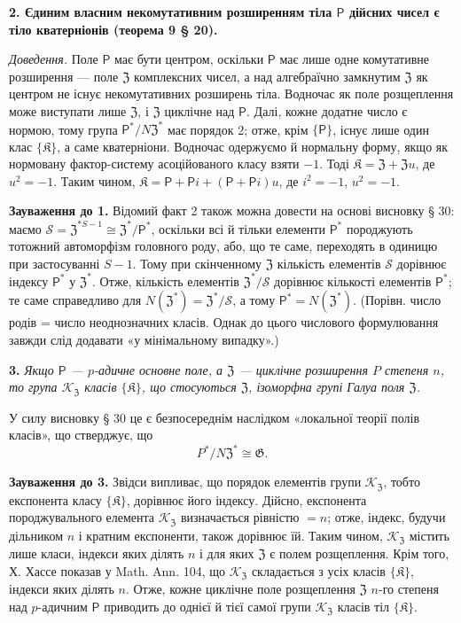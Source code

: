 \documentclass[11pt]{article}
\begin{document}
\noindent\textbf{2. Єдиним власним некомутативним розширенням тіла \(\mathsf{P}\) дійсних чисел є тіло кватерніонів (теорема 9 § 20).}

\noindent\emph{Доведення.} Поле \(\mathsf{P}\) має бути центром, оскільки \(\mathsf{P}\) має лише одне комутативне розширення --- поле \(\mathfrak Z\) комплексних чисел, а над алгебраїчно замкнутим \(\mathfrak Z\) як центром не існує некомутативних розширень тіла. Водночас як поле розщеплення може виступати лише \(\mathfrak Z\), і \(\mathfrak Z\) циклічне над \(\mathsf{P}\). Далі, кожне додатне число є нормою, тому група \(\mathsf{P}^*/N\mathfrak Z^*\) має порядок 2; отже, крім \(\{\mathsf{P}\}\), існує лише один клас \(\{\mathfrak K\}\), а саме кватерніони. Водночас одержуємо й нормальну форму, якщо як нормовану фактор-систему асоційованого класу взяти \(-1\). Тоді \(\mathfrak K=\mathfrak Z+\mathfrak Zu\), де \(u^2=-1\). Таким чином, \(\mathfrak K=\mathsf P+\mathsf Pi+(\mathsf P+\mathsf Pi)u\), де \(i^2=-1\), \(u^2=-1\).

\noindent\textbf{Зауваження до 1.} Відомий факт 2 також можна довести на основі висновку § 30: маємо \(\mathscr S=\mathfrak Z^{*S-1}\cong\mathfrak Z^*/\mathsf{P}^*\), оскільки всі й тільки елементи \(\mathsf{P}^*\) породжують тотожний автоморфізм головного роду, або, що те саме, переходять в одиницю при застосуванні \(S-1\). Тому при скінченному \(\mathfrak Z\) кількість елементів \(\mathscr S\) дорівнює індексу \(\mathsf{P}^*\) у \(\mathfrak Z^*\). Отже, кількість елементів \(\mathfrak Z^*/\mathscr S\) дорівнює кількості елементів \(\mathsf{P}^*\); те саме справедливо для \(N(\mathfrak Z^*)=\mathfrak Z^*/\mathscr S\), а тому \(\mathsf{P}^*=N(\mathfrak Z^*)\). (Порівн. число родів = число неоднозначних класів. Однак до цього числового формулювання завжди слід додавати «у мінімальному випадку».)

\noindent\textbf{3.} \emph{Якщо \(\mathsf{P}\) --- \(p\)-адичне основне поле, а \(\mathfrak Z\) --- циклічне розширення \(P\) степеня \(n\), то група \(\mathscr K_{\mathfrak Z}\) класів \(\{\mathfrak K\}\), що стосуються \(\mathfrak Z\), ізоморфна групі Галуа поля \(\mathfrak Z\).}

У силу висновку § 30 це є безпосереднім наслідком «локальної теорії полів класів», що стверджує, що
\[
P^*/N\mathfrak Z^*\cong\mathfrak G.
\]

\noindent\textbf{Зауваження до 3.} Звідси випливає, що порядок елементів групи \(\mathscr K_{\mathfrak Z}\), тобто експонента класу \(\{\mathfrak K\}\), дорівнює його індексу. Дійсно, експонента породжувального елемента \(\mathscr K_{\mathfrak Z}\) визначається рівністю \(=n\); отже, індекс, будучи дільником \(n\) і кратним експоненти, також дорівнює їй. Таким чином, \(\mathscr K_{\mathfrak Z}\) містить лише класи, індекси яких ділять \(n\) і для яких \(\mathfrak Z\) є полем розщеплення. Крім того, Х. Хассе показав у Math. Ann. 104, що \(\mathscr K_{\mathfrak Z}\) складається з усіх класів \(\{\mathfrak K\}\), індекси яких ділять \(n\). Отже, кожне циклічне поле розщеплення \(\mathfrak Z\) \(n\)-го степеня над \(p\)-адичним \(\mathsf{P}\) приводить до однієї й тієї самої групи \(\mathscr K_{\mathfrak Z}\) класів тіл \(\{\mathfrak K\}\).
\end{document}
